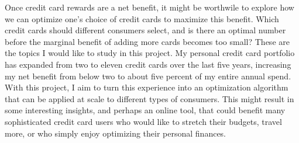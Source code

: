 Once credit card rewards are a net benefit, it might be worthwile to explore how we can optimize one's choice of credit cards to maximize this benefit. Which credit cards should different consumers select, and is there an optimal number before the marginal benefit of adding more cards becomes too small?  
These are the topics I would like to study in this project. 
My personal credit card portfolio has expanded from two to eleven credit cards over the last five years, increasing my net benefit from below two to about five percent of my entire annual spend.
With this project, I aim to turn this experience into an optimization algorithm that can be applied at scale to different types of consumers. This might result in some interesting insights, and perhaps an online tool, that could benefit many sophisticated credit card users who would like to stretch their budgets, travel more, or who simply enjoy optimizing their personal finances.
